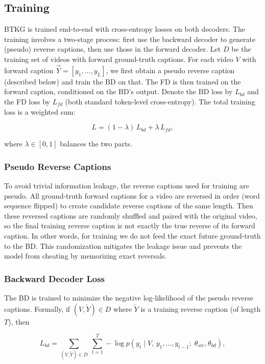 

\subsection{Training}

BTKG is trained end-to-end with cross-entropy losses on both decoders. The training involves a two-stage process: first use the backward decoder to generate (pseudo) reverse captions, then use those in the forward decoder. Let $D$ be the training set of videos with forward ground-truth captions. For each video $V$ with forward caption $\overrightarrow{Y}=[y_1,\dots,y_L]$, we first obtain a pseudo reverse caption (described below) and train the BD on that. The FD is then trained on the forward caption, conditioned on the BD's output. Denote the BD loss by $L_{bd}$ and the FD loss by $L_{fd}$ (both standard token-level cross-entropy). The total training loss is a weighted sum:

$$
L = (1-\lambda)\,L_{bd} + \lambda\,L_{fd},
$$

where $\lambda\in[0,1]$ balances the two parts.

\subsubsection{Pseudo Reverse Captions}

To avoid trivial information leakage, the reverse captions used for training are pseudo. All ground-truth forward captions for a video are reversed in order (word sequence flipped) to create candidate reverse captions of the same length. Then these reversed captions are randomly shuffled and paired with the original video, so the final training reverse caption is not exactly the true reverse of its forward caption. In other words, for training we do not feed the exact future ground-truth to the BD. This randomization mitigates the leakage issue and prevents the model from cheating by memorizing exact reversals.

\subsubsection{Backward Decoder Loss}

The BD is trained to minimize the negative log-likelihood of the pseudo reverse captions. Formally, if $(V,\overleftarrow{Y})\in D$ where $\overleftarrow{Y}$ is a training reverse caption (of length $T$), then

$$
L_{bd} = \sum_{(V,\overleftarrow{Y})\in D}\;\sum_{t=1}^T -\log p(y_t \mid V,\,y_1,\dots,y_{t-1};\;\theta_{ste},\theta_{bd}),
$$


